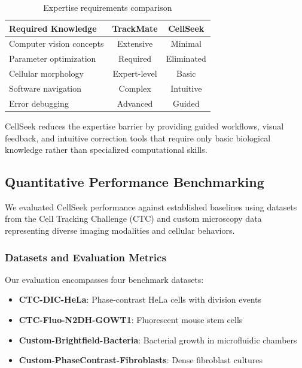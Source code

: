 \documentclass[../cellseek_paper.tex]{subfiles}
\begin{document}
\begin{table}[H]
  \centering
  \caption{Expertise requirements comparison}
  \begin{tabular}{lcc}
    \toprule
    \textbf{Required Knowledge} & \textbf{TrackMate} & \textbf{CellSeek} \\
    \midrule
    Computer vision concepts    & Extensive          & Minimal           \\
    Parameter optimization      & Required           & Eliminated        \\
    Cellular morphology         & Expert-level       & Basic             \\
    Software navigation         & Complex            & Intuitive         \\
    Error debugging             & Advanced           & Guided            \\
    \bottomrule
  \end{tabular}
\end{table}

CellSeek reduces the expertise barrier by providing guided workflows, visual feedback, and intuitive correction tools that require only basic biological knowledge rather than specialized computational skills.

\subsection{Quantitative Performance Benchmarking}

We evaluated CellSeek performance against established baselines using datasets from the Cell Tracking Challenge (CTC) and custom microscopy data representing diverse imaging modalities and cellular behaviors.

\subsubsection{Datasets and Evaluation Metrics}

Our evaluation encompasses four benchmark datasets:
\begin{itemize}
  \item \textbf{CTC-DIC-HeLa}: Phase-contrast HeLa cells with division events
  \item \textbf{CTC-Fluo-N2DH-GOWT1}: Fluorescent mouse stem cells
  \item \textbf{Custom-Brightfield-Bacteria}: Bacterial growth in microfluidic chambers
  \item \textbf{Custom-PhaseContrast-Fibroblasts}: Dense fibroblast cultures
\end{itemize}
\end{document}
